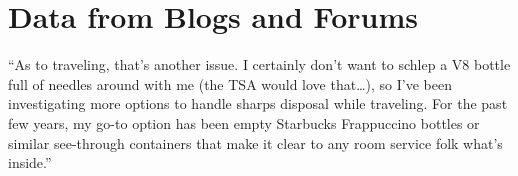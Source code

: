 \documentclass[12pt]{article}
\begin{document}
\newpage
\section{Data from Blogs and Forums}

``As to traveling, that’s another issue. I certainly don’t want to schlep a V8 bottle full of needles around with me (the TSA would love that…), so I’ve been investigating more options to handle sharps disposal while traveling. For the past few years, my go-to option has been empty Starbucks Frappuccino bottles or similar see-through containers that make it clear to any room service folk what’s inside.''



\newpage
\singlespacing


\end{document}
